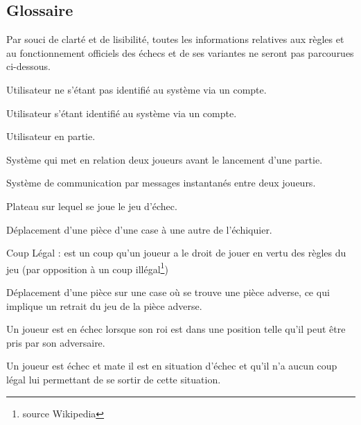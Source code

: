 \documentclass[10pt, a4paper]{article}
\begin{document}
		\subsection{Glossaire} Par souci de clarté et de lisibilité, toutes les informations relatives aux règles et au fonctionnement officiels des échecs et de ses variantes ne seront pas parcourues ci-dessous.
		\begin{description}
		\item[Un utilisateur non-enregistré :] Utilisateur ne s'étant pas identifié au système via un compte.
		\item[Un utilisateur enregistré :] Utilisateur s'étant identifié au système via un compte.
		\item[Joueur :] Utilisateur en partie.
		\item[Matchmaking :] Système qui met en relation deux joueurs avant le lancement d'une partie.
		\item[Chat :] Système de communication par messages instantanés entre deux joueurs.
		\item[Echiquier (Board) :] Plateau sur lequel se joue le jeu d'échec.
		\item[Coup/Mouvement :] Déplacement d'une pièce d'une case à une autre de l'échiquier.
		\item{Coup Légal :} est un coup qu'un joueur a le droit de jouer en vertu des règles du jeu (par opposition à un coup illégal\footnote{source Wikipedia})
		\item[Prise :] Déplacement d'une pièce sur une case où se trouve une pièce adverse, ce qui implique un retrait du jeu de la pièce adverse.
		\item[Echec :] Un joueur est en échec lorsque son roi est dans une position telle qu'il peut être pris par son adversaire.
		\item[Echec et mate :] Un joueur est échec et mate il est en situation d'échec et qu'il n'a aucun coup légal lui permettant de se sortir de cette situation.

\end{description}
\end{document}
